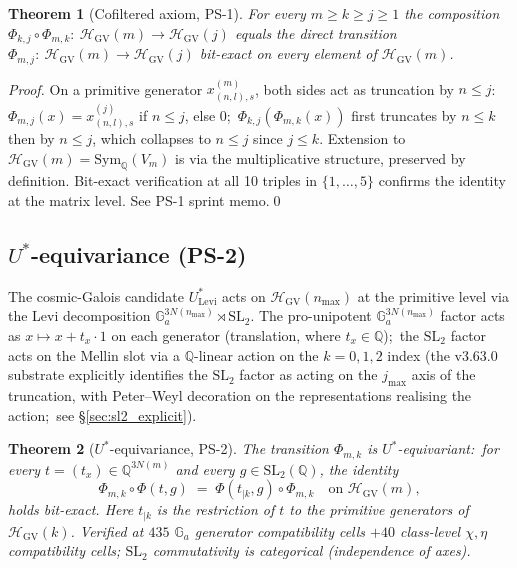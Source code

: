 \documentclass[11pt,a4paper]{article}
\theoremstyle{plain}
\newtheorem{theorem}{Theorem}[section]
\theoremstyle{definition}
\newcommand{\nmax}{n_{\max}}
\newcommand{\HGV}{\mathcal{H}_{\mathrm{GV}}}
\newcommand{\Sym}{\mathrm{Sym}}
\newcommand{\SL}{\mathrm{SL}}
\newcommand{\Ga}{\mathbb{G}_{a}}
\newcommand{\Q}{\mathbb{Q}}
\newcommand{\Ulev}{U^{*}_{\mathrm{Levi}}}
\newcommand{\Ustar}{U^{*}}
\newcommand{\Phimap}{\Phi}
\begin{document}
\begin{theorem}[Cofiltered axiom, PS-1]\label{thm:cofiltered}
For every $m \ge k \ge j \ge 1$ the composition $\Phi_{k, j} \circ
\Phi_{m, k} :\ \HGV(m) \to \HGV(j)$ equals the direct transition
$\Phi_{m, j} :\ \HGV(m) \to \HGV(j)$ bit-exact on every element of
$\HGV(m)$.
\end{theorem}

\begin{proof}
On a primitive generator $x^{(m)}_{(n, l), s}$, both sides act as
truncation by $n \le j$:\ $\Phi_{m, j}(x) = x^{(j)}_{(n, l), s}$ if
$n \le j$, else $0$;\ $\Phi_{k, j}(\Phi_{m, k}(x))$ first truncates by
$n \le k$ then by $n \le j$, which collapses to $n \le j$ since
$j \le k$. Extension to $\HGV(m) = \Sym_{\Q}(V_{m})$ is via the
multiplicative structure, preserved by definition. Bit-exact
verification at all 10 triples in $\{1, \ldots, 5\}$ confirms the
identity at the matrix level. See PS-1 sprint memo.\qed
\end{proof}

\subsection{$\Ustar$-equivariance (PS-2)}\label{sec:ustar_equiv}

The cosmic-Galois candidate $\Ulev$ acts on $\HGV(\nmax)$ at the
primitive level via the Levi decomposition $\Ga^{3 N(\nmax)} \rtimes
\SL_{2}$. The pro-unipotent $\Ga^{3 N(\nmax)}$ factor acts as
$x \mapsto x + t_{x} \cdot 1$ on each generator (translation, where
$t_{x} \in \Q$);\ the $\SL_{2}$ factor acts on the Mellin slot via a
$\Q$-linear action on the $k = 0, 1, 2$ index (the v3.63.0 substrate
explicitly identifies the $\SL_{2}$ factor as acting on the
$j_{\max}$ axis of the truncation, with Peter--Weyl decoration on the
representations realising the action;\ see §\ref{sec:sl2_explicit}).

\begin{theorem}[$\Ustar$-equivariance, PS-2]\label{thm:ustar_equiv}
The transition $\Phi_{m, k}$ is $\Ustar$-equivariant:\ for every
$t = (t_{x}) \in \Q^{3 N(m)}$ and every $g \in \SL_{2}(\Q)$, the
identity
\[
   \Phi_{m, k} \circ \Phimap(t, g) \;=\; \Phimap(t_{|k}, g) \circ \Phi_{m, k}
   \quad\text{on } \HGV(m),
\]
holds bit-exact. Here $t_{|k}$ is the restriction of $t$ to the
primitive generators of $\HGV(k)$. Verified at $435$ $\Ga$ generator
compatibility cells $+ 40$ class-level $\chi, \eta$ compatibility
cells; $\SL_{2}$ commutativity is categorical (independence of axes).
\end{theorem}
\end{document}
